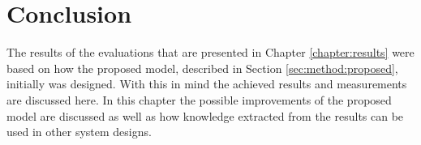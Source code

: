 \chapter{Conclusion}
\label{chapter:conclusion}
The results of the evaluations that are presented in Chapter \ref{chapter:results} were based on how the proposed model, described in Section \ref{sec:method:proposed}, initially was designed. With this in mind the achieved results and measurements are discussed here. In this chapter the possible improvements of the proposed model are discussed as well as how knowledge extracted from the results can be used in other system designs.



